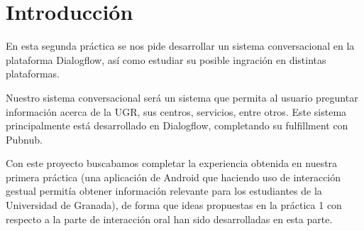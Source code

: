 \section{Introducción}

En esta segunda práctica se nos pide desarrollar un sistema conversacional en la plataforma Dialogflow, así como estudiar su posible ingración en distintas plataformas.

Nuestro sistema conversacional será un sistema que permita al usuario preguntar información acerca de la UGR, sus centros, servicios, entre otros. Este sistema principalmente está desarrollado en Dialogflow, completando su fulfillment con Pubnub.

Con este proyecto buscabamos completar la experiencia obtenida en nuestra primera práctica (una aplicación de Android que haciendo uso de interacción gestual permitía obtener información relevante para los estudiantes de la Universidad de Granada), de forma que ideas propuestas en la práctica 1 con respecto a la parte de interacción oral han sido desarrolladas en esta parte.


